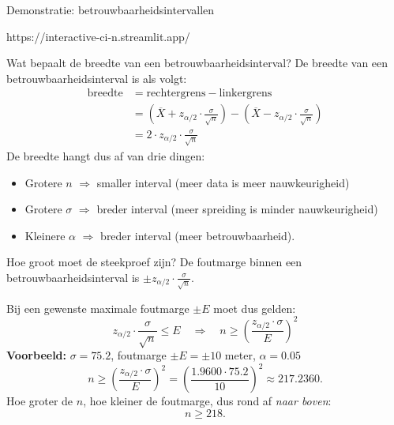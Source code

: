     

    \begin{frame}{Demonstratie: betrouwbaarheidsintervallen}
        \begin{center}
            \Large https://interactive-ci-n.streamlit.app/
        \end{center}
    \end{frame}

    \begin{frame}{Wat bepaalt de breedte van een betrouwbaarheidsinterval?}
        De breedte van een betrouwbaarheidsinterval is als volgt:
        \begin{align*}
            \text{breedte}  &= \text{rechtergrens} - \text{linkergrens} \\
                            &= \left(\overline{X} + z_{\alpha/2} \cdot \frac{\sigma}{\sqrt{n}}\right) - \left(\overline{X} - z_{\alpha/2} \cdot \frac{\sigma}{\sqrt{n}}\right) \\
                            &= 2 \cdot z_{\alpha/2} \cdot \frac{\sigma}{\sqrt{n}}
        \end{align*}
        \vfill\pause
        De breedte hangt dus af van drie dingen:
        \begin{itemize}[<+->]\setlength\itemsep{1em}
            \item Grotere $n$ $\Rightarrow$ smaller interval (meer data is meer nauwkeurigheid)
            \item Grotere $\sigma$ $\Rightarrow$ breder interval (meer spreiding is minder nauwkeurigheid)
            \item Kleinere $\alpha$ $\Rightarrow$ breder interval (meer betrouwbaarheid).
        \end{itemize}
    \end{frame}

    \begin{frame}{Hoe groot moet de steekproef zijn?}
        De foutmarge binnen een betrouwbaarheidsinterval is $\pm z_{\alpha/2} \cdot \frac{\sigma}{\sqrt{n}}$.

        Bij een gewenste maximale foutmarge $\pm E$ moet dus gelden:
        \[
            z_{\alpha/2} \cdot \frac{\sigma}{\sqrt{n}} \leq E \quad \Rightarrow \quad n \geq \left(\frac{z_{\alpha/2} \cdot \sigma}{E}\right)^2
        \]
        \vfill\pause
        \textbf{Voorbeeld:} $\sigma = 75.2$, foutmarge $\pm E = \pm 10$ meter, $\alpha = 0.05$
        \[
            n \geq \left(\frac{z_{\alpha/2} \cdot \sigma}{E}\right)^2 = \left(\frac{1.9600 \cdot 75.2}{10}\right)^2 \approx 217.2360.
        \]
        \vfill\pause
        Hoe groter de $n$, hoe kleiner de foutmarge, dus rond af \emph{naar boven}:
        \[
            n \geq 218.
        \]
    \end{frame}

